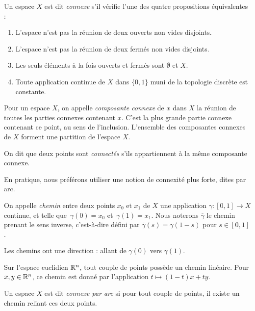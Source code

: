 \begin{definition}
Un espace $X$ est dit \emph{connexe} s'il vérifie l'une des quatre propositions équivalentes : \begin{enumerate}
    \item L'espace n'est pas la réunion de deux ouverts non vides disjoints.
    \item L'espace n'est pas la réunion de deux fermés non vides disjoints.
    \item Les seuls éléments à la fois ouverts et fermés sont $\emptyset$ et $X$.
    \item Toute application continue de $X$ dans $\{0,1\}$ muni de la topologie discrète est constante.
\end{enumerate}

Pour un espace $X$, on appelle \emph{composante connexe} de $x$ dans $X$ la réunion de toutes les parties connexes contenant $x$. C'est la plus grande partie connexe contenant ce point, au sens de l'inclusion. L'ensemble des composantes connexes de $X$ forment une partition de l'espace $X$.

On dit que deux points sont \emph{connectés} s'ils appartiennent à la même composante connexe.
\end{definition}

En pratique, nous préférons utiliser une notion de connexité plus forte, dites par arc.

\begin{definition}\label{def:path}
On appelle \emph{chemin} entre deux points $x_0$ et $x_1$ de $X$ une application $\gamma:[0,1]\to X$ continue, et telle que~$\gamma(0)=x_0$ et~$\gamma(1)=x_1$. Nous noterons $\overline{\gamma}$ le chemin prenant le sens inverse, c'est-à-dire défini par $\overline{\gamma}(s)=\gamma(1-s)$ pour $s\in[0,1]$.
\end{definition}

Les chemins ont une direction : allant de $\gamma(0)$ vers $\gamma(1)$.

\begin{exemple}
Sur l'espace euclidien $\mathbb{R}^n$, tout couple de points possède un chemin linéaire. Pour $x,y\in\mathbb{R}^n$, ce chemin est donné par l'application $t\mapsto (1-t)x+ty$.
\end{exemple}

\begin{definition}
Un espace $X$ est dit \emph{connexe par arc} si pour tout couple de points, il existe un chemin reliant ces deux points.
\end{definition}

